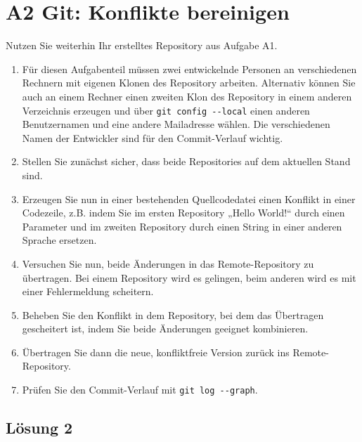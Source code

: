 \documentclass[main.tex]{subfiles}
\begin{document}
\pagebreak

\section{A2 Git: Konflikte bereinigen}
Nutzen  Sie weiterhin Ihr erstelltes Repository aus Aufgabe A1.

\lstset{language=bash}

\lstset{style=MyCodeStyle}

\renewcommand{\labelenumi}{\arabic{enumi}.}

\begin{enumerate}
\item Für diesen Aufgabenteil müssen zwei entwickelnde Personen an verschiedenen Rechnern mit eigenen Klonen des Repository arbeiten. Alternativ können Sie auch an einem Rechner einen zweiten Klon des Repository in einem anderen Verzeichnis erzeugen und über
\lstinline|git config --local|
einen anderen Benutzernamen und eine andere Mailadresse wählen. Die verschiedenen Namen der Entwickler sind für den Commit-Verlauf wichtig.
\item Stellen Sie zunächst sicher, dass beide Repositories auf dem aktuellen Stand sind.
\item Erzeugen Sie nun in einer bestehenden Quellcodedatei einen Konflikt in einer Codezeile,
z.B. indem Sie im ersten Repository „Hello World!“ durch einen Parameter und im zweiten Repository durch einen String in einer anderen Sprache ersetzen.

\item Versuchen Sie nun, beide Änderungen in das Remote-Repository zu übertragen. Bei einem Repository wird es gelingen, beim anderen wird es mit einer Fehlermeldung scheitern.
\item Beheben Sie den Konflikt in dem Repository, bei dem das Übertragen gescheitert ist, indem Sie beide Änderungen geeignet kombinieren.
\item Übertragen Sie dann die neue, konfliktfreie Version zurück ins Remote-Repository.
\item Prüfen Sie den Commit-Verlauf mit \lstinline|git log --graph|.

\end{enumerate}

\subsection{Lösung 2}
\end{document}
